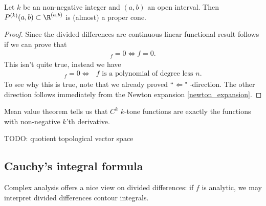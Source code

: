 \begin{lause}
	Let $k$ be an non-negative integer and $(a, b)$ an open interval. Then $P^{(k)}(a, b) \subset \R^{(a, b)}$ is (almost) a proper cone.
\end{lause}
\begin{proof}
	Since the divided differences are continuous linear functional result follows if we can prove that
	\begin{align*}
		[\cdot, \cdot, \ldots, \cdot]_{f} = 0 \Leftrightarrow f = 0.
	\end{align*}
	This isn't quite true, instead we have
	\begin{align*}
		[\cdot, \cdot, \ldots, \cdot]_{f} = 0 \Leftrightarrow \text{ $f$ is a polynomial of degree less $n$}.
	\end{align*}
	To see why this is true, note that we already proved ``$\Leftarrow$" -direction. The other direction follows immediately from the Newton expansion \ref{newton_expansion}.
\end{proof}

Mean value theorem tells us that $C^{k}$ $k$-tone functions are exactly the functions with non-negative $k$'th derivative.

TODO: quotient topological vector space

\subsection{Cauchy's integral formula}

Complex analysis offers a nice view on divided differences: if $f$ is analytic, we may interpret divided differences contour integrals.

